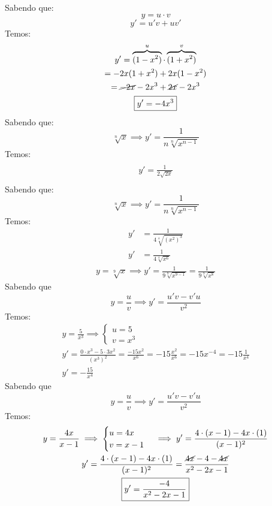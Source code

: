 \documentclass{jhwhw}
\begin{document}
Sabendo que: \[
    y = u \cdot v\]\[
    y' = u' v + u v'
\]
Temos:
\begin{multline*}
    y' = \overbrace{(1-x^2)}^{u} \cdot \overbrace{(1+x^2)}^{v} \\
    = -2x(1+x^2) + 2x(1-x^2) \\
    = \cancel{-2x} - 2x^3 + \cancel{2x} - 2x^3 \\
    \boxed{y'= -4x^3}
\end{multline*}
Sabendo que: \[
    \sqrt[n]{x} \implies y' = \frac{1}{n\sqrt[n]{x^{n-1}}}
\]
Temos:
\begin{multline*}
    \\\boxed{y' = \frac{1}{2\sqrt{2x}}}\\
\end{multline*}
Sabendo que: \[
    \sqrt[n]{x} \implies y' = \frac{1}{n\sqrt[n]{x^{n-1}}}
\]
Temos:
\begin{align*}
    y' & = \frac{1}{4\sqrt[4]{(x^2)^{3}}} \\
    y' & = \frac{1}{4\sqrt[4]{x^6}}
\end{align*}
\begin{align*}
    y = \sqrt[9]{x} \implies y' = \frac{1}{9\sqrt[9]{x^{9-1}}} = \frac{1}{9\sqrt[9]{x^{8}}}
\end{align*}
Sabendo que \[
    y = \frac{u}{v} \implies y' = \frac{u' v - v' u}{v^2}
\] 
Temos:
\begin{multline*}
    y = \frac{5}{x^3} \implies \begin{cases}
        u = 5 \\
        v = x^3
    \end{cases}\\
    y' = \frac{0 \cdot x^3 - 5 \cdot 3x^2}{(x^3)^2}
    = \frac{-15x^2}{x^6}
    = -15 \frac{x^2}{x^6} = -15 x^{-4} = -15 \frac{1}{x^4} \\ \boxed{y' = -\frac{15}{x^4}}
\end{multline*}
Sabendo que \[
    y = \frac{u}{v} \implies y' = \frac{u' v - v' u}{v^2}
\] 
Temos:
\begin{multline*}
    y = \frac{4x}{x-1} \implies \begin{cases}
        u = 4x \\
        v = x-1
    \end{cases} \implies y' = \frac{4 \cdot (x-1) - 4x \cdot (1)}{(x-1)^2}\\
    y' = \frac{4 \cdot (x-1) - 4x \cdot (1)}{(x-1)^2} = \frac{\cancel{4x}-4-\cancel{4x}}{x^2-2x-1} \\ \boxed{y' = \frac{-4}{x^2-2x-1}}
\end{multline*}
\newpage
\reset
\end{document}
